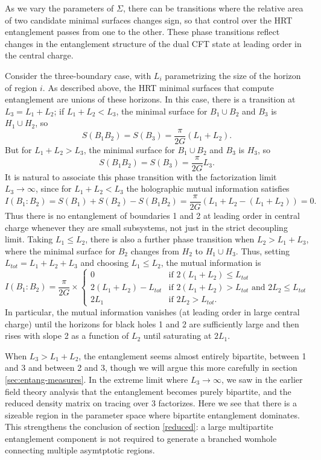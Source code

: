 \documentclass[12pt]{article}
\newcommand{\be}{\begin{equation}}
\newcommand{\ee}{\end{equation}}
\numberwithin{equation}{section}
\begin{document}
As we vary the parameters of $\Sigma$, there can be transitions where the relative area of two candidate minimal surfaces changes sign, so that control over the HRT entanglement passes from one to the other. These phase transitions reflect changes in the entanglement structure of the dual CFT state at leading order in the central charge.

Consider the three-boundary case, with $L_i$ parametrizing the size of the horizon of region $i$.     As described above, the HRT minimal surfaces that compute entanglement are unions of these horizons.   In this case, there is a transition at $L_3 = L_1 + L_2$; if $L_1 + L_2 < L_3$, the minimal surface for $B_1 \cup B_2$ and $B_3$ is $H_1 \cup H_2$, so
%
\be
S(B_1   B_2) = S(B_3) =  \frac{\pi}{2 G} (L_1 + L_2).
\ee
%
But for $L_1 + L_2 > L_3$, the minimal surface for $B_1 \cup B_2$ and $B_3$ is $H_3$, so
%
\be
\label{3small}
S(B_1   B_2) = S(B_3) =  \frac{\pi}{2 G} L_3.
\ee
%
It is natural to associate this phase transition with the factorization limit $L_3 \to \infty$, since for $L_1 + L_2 < L_3$ the holographic mutual information satisfies
%
\be
I(B_1 : B_2) = S(B_1) + S(B_2) - S(B_1   B_2) = \frac{\pi}{2G} ( L_1 + L_2 - (L_1 + L_2) ) =0.
\ee
%
Thus there is no entanglement of boundaries 1 and 2 at leading order in central charge whenever they are small subsystems, not just in the strict decoupling limit. Taking $L_1 \leq L_2$, there is also a further phase transition when $L_2 > L_1 + L_3$, where the minimal surface for $B_2$ changes from $H_2$ to $H_1 \cup H_3$. Thus, setting $L_{tot} = L_1 + L_2 + L_3$ and choosing $L_1 \leq L_2$, the mutual information is
\be \label{eqn:mi-piecewise}
I(B_1 : B_2 ) =
	\frac{\pi}{2G} \times \begin{cases}
		0  & \text{if } 2( L_1 + L_2 ) \leq  L_{tot} \\
		2(L_1 + L_2) - L_{tot} & \text{if } 2( L_1 + L_2 ) > L_{tot}
				\text{ and } 2 L_2 \leq L_{tot} \\
		2 L_1 & \text{if } 2 L_2 > L_{tot}.
	\end{cases}
\ee
In particular, the mutual information vanishes (at leading order in large central charge) until the horizons for black holes 1 and 2 are sufficiently large and then rises with slope 2 as a function of $L_2$ until saturating at $2 L_1$.

When $L_3 > L_1 + L_2$, the entanglement seems almost entirely bipartite, between 1 and 3 and between 2 and 3, though we will argue this more carefully in section \ref{sec:entang-measures}. In the extreme limit where $L_3 \to \infty$, we saw in the earlier field theory analysis that the entanglement becomes purely bipartite, and the reduced density matrix on tracing over 3 factorizes. Here we see that there is a sizeable region in the parameter space where bipartite entanglement dominates.  This strengthens the conclusion of section \ref{reduced}: a large multipartite entanglement component is not required to generate a branched womhole connecting multiple asymtptotic regions.
\end{document}
